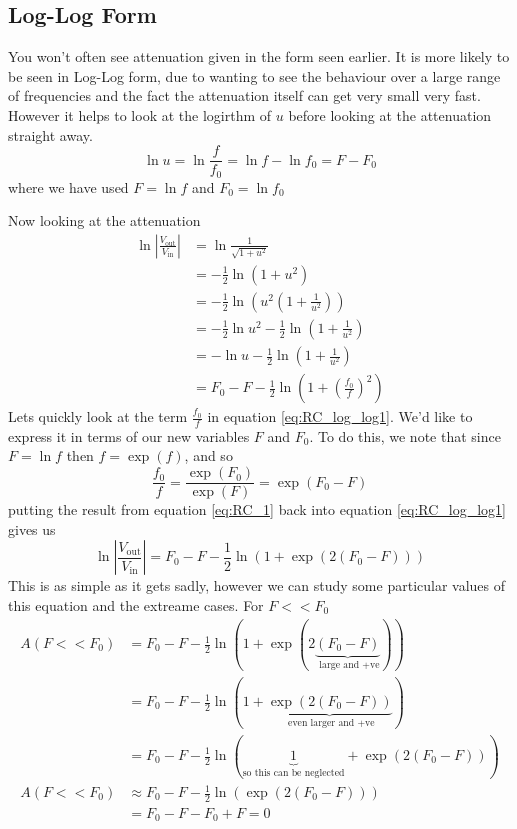 \subsection{Log-Log Form}
You won't often see attenuation given in the form seen earlier. It is more likely
to be seen in Log-Log form, due to wanting to see the behaviour over a large range
of frequencies and the fact the attenuation itself can get very small very fast.
However it helps to look at the logirthm of $u$ before looking at the attenuation
straight away.
\begin{equation}
  \ln u = \ln \frac{f}{f_0} = \ln f - \ln f_0 = F - F_0
\end{equation}
where we have used $F=\ln f$ and $F_0 = \ln f_0 $

Now looking at the attenuation
\begin{align}
  \ln \left|\frac{V_{\text{out}}}{V_{\text{in}}} \right| & = \ln \frac{1}{\sqrt{1+u^2}} \nonumber \\
  &= -\frac{1}{2} \ln \left(1+u^2\right) \nonumber \\
  &= -\frac{1}{2} \ln \left(u^2\left(1+\frac{1}{u^2}\right)\right) \nonumber \\
  &= -\frac{1}{2} \ln u^2 -\frac{1}{2} \ln\left(1+\frac{1}{u^2}\right) \nonumber \\
  &= -\ln u -\frac{1}{2} \ln\left(1+\frac{1}{u^2}\right) \nonumber \\
  &= F_0 - F  -\frac{1}{2} \ln\left(1+\left(\frac{f_0}{f}\right)^2\right) \label{eq:RC_log_log1}
\end{align}
Lets quickly look at the term $\frac{f_0}{f}$ in equation \ref{eq:RC_log_log1}.
We'd like to express it in terms of our new variables $F$ and $F_0$. To do this,
we note that since $F = \ln f$ then $f = \exp(f)$, and so
\begin{equation}
  \frac{f_0}{f} = \frac{\exp(F_0)}{\exp(F)} = \exp( F_0 - F ) \label{eq:RC_1}
\end{equation}
putting the result from equation \ref{eq:RC_1} back into equation  \ref{eq:RC_log_log1}
gives us
\begin{equation}
  \ln \left|\frac{V_{\text{out}}}{V_{\text{in}}} \right| = F_0 - F  -\frac{1}{2} \ln\left(1+\exp(2(F_0 - F))\right) \label{eq:RC_log_log2}
\end{equation}
This is as simple as it gets sadly, however we can study some particular values
of this equation and the extreame cases.
For $F<<F_0$
\begin{align}
  A(F<<F_0) &= F_0 - F  -\frac{1}{2} \ln\left(1+\exp(2\underbrace{(F_0 - F)}_{\text{ large and +ve}})\right) \nonumber \\
  &= F_0 - F  -\frac{1}{2} \ln\left(1+\underbrace{\exp(2(F_0 - F))}_{\text{ even larger and +ve}}\right) \nonumber \\
  &= F_0 - F  -\frac{1}{2} \ln\left(\underbrace{1}_{\text{so this can be neglected}}+\exp(2(F_0 - F))\right) \nonumber \\
  A(F<<F_0) &\approx F_0 - F  -\frac{1}{2} \ln\left(\exp(2(F_0 - F))\right) \nonumber \\
  &= F_0 - F -F_0 + F = 0 \label{eq:RC_log_log_small_F}
\end{align}

